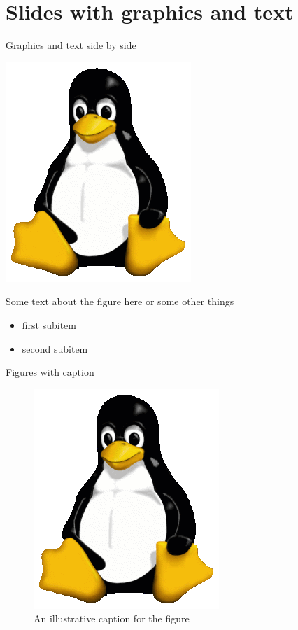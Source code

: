 \documentclass[11pt,t]{beamer}
\begin{document}
\section{Slides with graphics and text}
\begin{frame}{Graphics and text side by side}
	\fboxsep=0pt
	\noindent%
	\begin{minipage}[b]{0.39\linewidth}
		\centering
		\includegraphics[width=.5\textwidth,natwidth=265,natheight=314]{fig/Tux.png}
	\end{minipage}%
	\hfill%
	\begin{minipage}[b]{0.59\linewidth}
		Some text about the figure here or some other things
		\begin{itemize}
			\item first subitem
			\item second subitem
		\end{itemize}
	\end{minipage}%
\end{frame}
\begin{frame}{Figures with caption}
	\begin{figure}
		\centering
		\includegraphics[width=.5\textheight,natwidth=265,natheight=314]{fig/Tux.png}
		\caption{An illustrative caption for the figure}
	\end{figure}
\end{frame}
\end{document}
